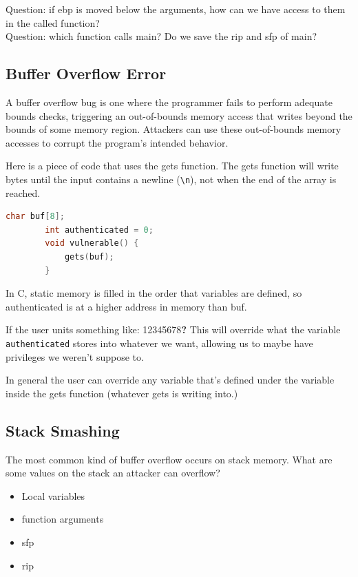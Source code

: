 \documentclass{article}
\begin{document}
{\color{red} Question: if ebp is moved below the arguments, how can we have access to them in the called function?}\\
{\color{red} Question: which function calls main? Do we save the rip and sfp of main?}

\subsection{Buffer Overflow Error}
A buffer overflow bug is one where the programmer fails to perform adequate bounds checks, triggering an out-of-bounds memory access that writes beyond the bounds of some memory region. Attackers can use these out-of-bounds memory accesses to corrupt the program's intended behavior.

\begin{example}
    Here is a piece of code that uses the gets function. The gets function will write bytes until the input contains a newline (\lstinline{\n}), not when the end of the array is reached.
    \begin{lstlisting}[language=C]
        char buf[8];
        int authenticated = 0;
        void vulnerable() {
            gets(buf);
        }
    \end{lstlisting}

    In C, static memory is filled in the order that variables are defined, so authenticated is at a higher address in memory than buf.

    If the user units something like: 12345678\textbf{?}
    This will override what the variable \lstinline{authenticated} stores into whatever we want, allowing us to maybe have privileges we weren't suppose to.

    In general the user can override any variable that's defined under the variable inside the gets function (whatever gets is writing into.)
\end{example}

\subsection{Stack Smashing}
The most common kind of buffer overflow occurs on stack memory. What are some values on the stack an attacker can overflow?
\begin{itemize}
    \item Local variables
    \item function arguments
    \item sfp
    \item rip
\end{itemize}
\end{document}
